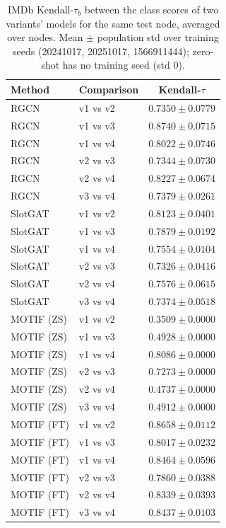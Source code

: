 \documentclass{article}
\begin{document}
\begin{table}[t]
\centering
\small
\begin{tabular}{||l||l||c||}
\hline
\textbf{Method} & \textbf{Comparison} & \textbf{Kendall-$\tau$} \\
\hline\hline
RGCN & v1 vs v2 & $0.7350 \pm 0.0779$ \\
\hline
RGCN & v1 vs v3 & $0.8740 \pm 0.0715$ \\
\hline
RGCN & v1 vs v4 & $0.8022 \pm 0.0746$ \\
\hline
RGCN & v2 vs v3 & $0.7344 \pm 0.0730$ \\
\hline
RGCN & v2 vs v4 & $0.8227 \pm 0.0674$ \\
\hline
RGCN & v3 vs v4 & $0.7379 \pm 0.0261$ \\
\hline
\hline
SlotGAT & v1 vs v2 & $0.8123 \pm 0.0401$ \\
\hline
SlotGAT & v1 vs v3 & $0.7879 \pm 0.0192$ \\
\hline
SlotGAT & v1 vs v4 & $0.7554 \pm 0.0104$ \\
\hline
SlotGAT & v2 vs v3 & $0.7326 \pm 0.0416$ \\
\hline
SlotGAT & v2 vs v4 & $0.7576 \pm 0.0615$ \\
\hline
SlotGAT & v3 vs v4 & $0.7374 \pm 0.0518$ \\
\hline
\hline
MOTIF (ZS) & v1 vs v2 & $0.3509 \pm 0.0000$ \\
\hline
MOTIF (ZS) & v1 vs v3 & $0.4928 \pm 0.0000$ \\
\hline
MOTIF (ZS) & v1 vs v4 & $0.8086 \pm 0.0000$ \\
\hline
MOTIF (ZS) & v2 vs v3 & $0.7273 \pm 0.0000$ \\
\hline
MOTIF (ZS) & v2 vs v4 & $0.4737 \pm 0.0000$ \\
\hline
MOTIF (ZS) & v3 vs v4 & $0.4912 \pm 0.0000$ \\
\hline
\hline
MOTIF (FT) & v1 vs v2 & $0.8658 \pm 0.0112$ \\
\hline
MOTIF (FT) & v1 vs v3 & $0.8017 \pm 0.0232$ \\
\hline
MOTIF (FT) & v1 vs v4 & $0.8464 \pm 0.0596$ \\
\hline
MOTIF (FT) & v2 vs v3 & $0.7860 \pm 0.0388$ \\
\hline
MOTIF (FT) & v2 vs v4 & $0.8339 \pm 0.0393$ \\
\hline
MOTIF (FT) & v3 vs v4 & $0.8437 \pm 0.0103$ \\
\hline
\end{tabular}
\caption{IMDb Kendall-$\tau_b$ between the class scores of two variants' models for the same test node, averaged over nodes. Mean $\pm$ population std over training seeds (20241017, 20251017, 1566911444); zero-shot has no training seed (std 0). }
\label{tab:nc_imdb_seed_invariance}
\end{table}
\end{document}
